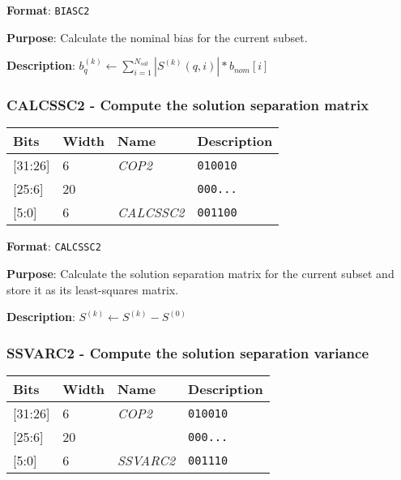 \documentclass[11pt]{article}
\begin{document}
\textbf{Format}: \texttt{BIASC2}

\textbf{Purpose}: Calculate the nominal bias for the current subset.

\textbf{Description}: $b_q^{(k)} \leftarrow \sum_{i=1}^{N_{sat}}|S^{(k)}(q,i)|*b_{nom}[i]$

\text{}
\subsubsection{CALCSSC2 - Compute the solution separation matrix}
\text{}

\begin{table}[H] \centering
  \def\arraystretch{1.4}
  \begin{tabular}{|m{2cm}|m{1.5cm}|m{2.5cm}|m{4.5cm}|}
    \hline
    \textbf{Bits} & \textbf{Width} & \textbf{Name} & \textbf{Description}\\ \hline

    [31:26] & 6 & \emph{COP2} & \texttt{010010}\\ \hline

    [25:6] & 20 & & \texttt{000...}\\ \hline

    [5:0] & 6 & \emph{CALCSSC2} & \texttt{001100}\\ \hline
  \end{tabular}
\end{table}

\textbf{Format}: \texttt{CALCSSC2}

\textbf{Purpose}: Calculate the solution separation matrix for the current subset and store it as its least-squares matrix.

\textbf{Description}: $S^{(k)} \leftarrow S^{(k)} - S^{(0)}$

\text{}
\subsubsection{SSVARC2 - Compute the solution separation variance}
\text{}

\begin{table}[H] \centering
  \def\arraystretch{1.4}
  \begin{tabular}{|m{2cm}|m{1.5cm}|m{2.5cm}|m{4.5cm}|}
    \hline
    \textbf{Bits} & \textbf{Width} & \textbf{Name} & \textbf{Description}\\ \hline

    [31:26] & 6 & \emph{COP2} & \texttt{010010}\\ \hline

    [25:6] & 20 & & \texttt{000...}\\ \hline

    [5:0] & 6 & \emph{SSVARC2} & \texttt{001110}\\ \hline
  \end{tabular}
\end{table}
\end{document}
